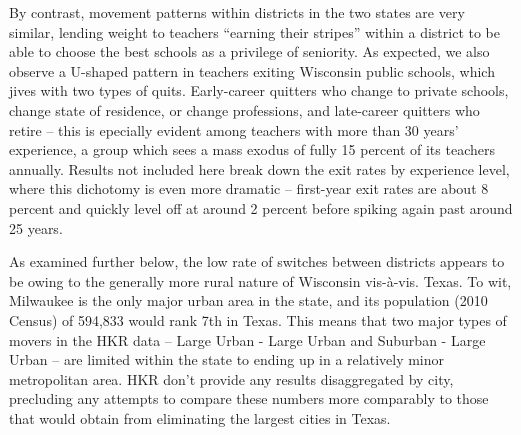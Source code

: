 \documentclass[12pt,]{article}
\begin{document}
By contrast, movement patterns within districts in the two states are
very similar, lending weight to teachers ``earning their stripes''
within a district to be able to choose the best schools as a privilege
of seniority. As expected, we also observe a U-shaped pattern in
teachers exiting Wisconsin public schools, which jives with two types of
quits. Early-career quitters who change to private schools, change state
of residence, or change professions, and late-career quitters who retire
-- this is epecially evident among teachers with more than 30 years'
experience, a group which sees a mass exodus of fully 15 percent of its
teachers annually. Results not included here break down the exit rates
by experience level, where this dichotomy is even more dramatic --
first-year exit rates are about 8 percent and quickly level off at
around 2 percent before spiking again past around 25 years.

As examined further below, the low rate of switches between districts
appears to be owing to the generally more rural nature of Wisconsin
vis-à-vis. Texas. To wit, Milwaukee is the only major urban area in the
state, and its population (2010 Census) of 594,833 would rank 7th in
Texas. This means that two major types of movers in the HKR data --
Large Urban - Large Urban and Suburban - Large Urban -- are limited
within the state to ending up in a relatively minor metropolitan area.
HKR don't provide any results disaggregated by city, precluding any
attempts to compare these numbers more comparably to those that would
obtain from eliminating the largest cities in Texas.
\end{document}
